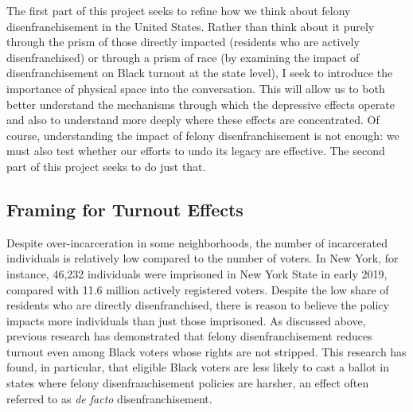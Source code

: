\documentclass[]{article}
\begin{document}
The first part of this project seeks to refine how we think about felony disenfranchisement in the United States. Rather than think about it purely through the prism of those directly impacted (residents who are actively disenfranchised) or through a prism of race (by examining the impact of disenfranchisement on Black turnout at the state level), I seek to introduce the importance of physical space into the conversation. This will allow us to both better understand the mechanisms through which the depressive effects operate and also to understand more deeply where these effects are concentrated. Of course, understanding the impact of felony disenfranchisement is not enough: we must also test whether our efforts to undo its legacy are effective. The second part of this project seeks to do just that.

\hypertarget{framing-for-turnout-effects}{%
\subsection*{Framing for Turnout Effects}\label{framing-for-turnout-effects}}

Despite over-incarceration in some neighborhoods, the number of incarcerated individuals is relatively low compared to the number of voters. In New York, for instance, 46,232 individuals were imprisoned in New York State in early 2019, compared with 11.6 million actively registered voters. Despite the low share of residents who are directly disenfranchised, there is reason to believe the policy impacts more individuals than just those imprisoned. As discussed above, previous research has demonstrated that felony disenfranchisement reduces turnout even among Black voters whose rights are not stripped. This research has found, in particular, that eligible Black voters are less likely to cast a ballot in states where felony disenfranchisement policies are harsher, an effect often referred to as \emph{de facto} disenfranchisement.
\end{document}

